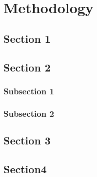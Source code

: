 \chapter{Methodology}
\lipsum[1-5]
\section{Section 1}
\lipsum[1-5]
\section{Section 2}
\lipsum[1-5]
\subsection{Subsection 1}
\lipsum[1-8]
\subsection{Subsection 2}
\lipsum[1-6]
\section{Section 3}
\lipsum[1-5]
\section{Section4}
\lipsum[1-10]